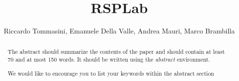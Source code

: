 \documentclass[runningheads,a4paper]{llncs}
\newcommand{\keywords}[1]{\par\addvspace\baselineskip
\noindent\keywordname\enspace\ignorespaces#1}
\begin{document}
\title{RSPLab}



\author{Riccardo Tommasini, Emanuele Della Valle, Andrea Mauri, Marco Brambilla}



\maketitle

\begin{abstract}
The abstract should summarize the contents of the paper and should
contain at least 70 and at most 150 words. It should be written using the
\emph{abstract} environment.
\keywords{We would like to encourage you to list your keywords within
the abstract section}
\end{abstract}



\end{document}
